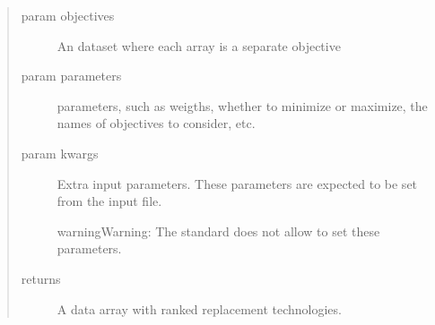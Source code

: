 \documentclass[letterpaper,10pt,english]{sphinxmanual}
\begin{document}
\begin{sphinxVerbatim}[commandchars=\\\{\}]
       
\end{sphinxVerbatim}
\begin{quote}\begin{description}
\item[{param objectives}] \leavevmode
An dataset where each array is a separate objective

\item[{param parameters}] \leavevmode
parameters, such as weigths, whether to minimize or maximize, the names
of objectives to consider, etc.

\item[{param kwargs}] \leavevmode
Extra input parameters. These parameters are expected to be set from the
input file.

\begin{sphinxadmonition}{warning}{Warning:}
The standard {\hyperref[\detokenize{inputs/agents:inputs-agents}]{}} does not allow to set
these parameters.
\end{sphinxadmonition}

\item[{returns}] \leavevmode
A data array with ranked replacement technologies.

\end{description}\end{quote}
\end{document}
